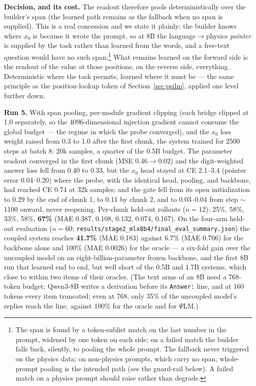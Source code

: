 \documentclass[11pt]{article}
\newcommand{\psilm}{$\Psi$LM}
\newcommand{\code}[1]{\texttt{#1}}
\begin{document}
\textbf{Decision, and its cost.} The readout therefore pools deterministically over the builder's span (the learned path remains as the fallback when no span is supplied). This is a real concession and we state it plainly: the builder knows where $x_0$ is because it wrote the prompt, so at 8B the language$\to$physics \emph{pointer} is supplied by the task rather than learned from the words, and a free-text question would have no such span.\footnote{The span is found by a token-sublist match on the last number in the prompt, widened by one token on each side; on a failed match the builder falls back, silently, to pooling the whole prompt. The fallback never triggered on the physics data; on non-physics prompts, which carry no span, whole-prompt pooling is the intended path (see the guard-rail below). A failed match on a physics prompt should raise rather than degrade.} What remains learned on the forward side is the readout of the value at those positions; on the reverse side, everything. Deterministic where the task permits, learned where it must be --- the same principle as the position-lookup token of Section~\ref{sec:psilm}, applied one level further down.

\textbf{Run 5.} With span pooling, per-module gradient clipping (each bridge clipped at 1.0 separately, so the 4096-dimensional injection gradient cannot consume the global budget --- the regime in which the probe converged), and the $x_0$ loss weight raised from 0.3 to 1.0 after the first chunk, the system trained for 2500 steps at batch 8: 20k samples, a quarter of the 0.5B budget. The parameter readout converged in the first chunk (MSE $0.46\to0.02$) and the digit-weighted answer loss fell from 0.40 to 0.33, but the $x_0$ head stayed at CE 2.1--3.4 (pointer error 0.04--0.20) where the probe, with the identical head, pooling, and backbone, had reached CE 0.74 at 32k samples; and the gate fell from its open initialization to 0.29 by the end of chunk 1, to 0.11 by chunk 2, and to 0.03--0.04 from step $\sim$1100 onward, never reopening. Per-chunk held-out rollouts ($n{=}12$): 25\%, 58\%, 33\%, 58\%, \textbf{67\%} (MAE 0.387, 0.108, 0.132, 0.074, 0.167). On the four-arm held-out evaluation ($n{=}60$; \code{results/stage2\_mlx8b4/final\_eval\_summary.json}) the coupled system reaches \textbf{41.7\%} (MAE 0.183) against 6.7\% (MAE 0.706) for the backbone alone and 100\% (MAE 0.0026) for the oracle --- a six-fold gain over the uncoupled model on an eight-billion-parameter frozen backbone, and the first 8B run that learned end to end, but well short of the 0.5B and 1.7B systems, which close to within two items of their oracles. (The text arms of an 8B need a 768-token budget: Qwen3-8B writes a derivation before its \code{Answer:} line, and at 160 tokens every item truncated; even at 768, only 35\% of the uncoupled model's replies reach the line, against 100\% for the oracle and for \psilm{}.)
\end{document}
